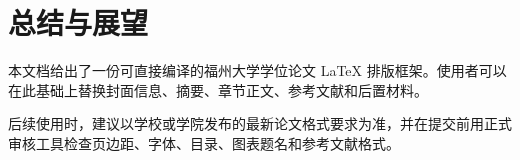 \chapter{总结与展望}

本文档给出了一份可直接编译的福州大学学位论文 \LaTeX{} 排版框架。使用者可以在此基础上替换封面信息、摘要、章节正文、参考文献和后置材料。

后续使用时，建议以学校或学院发布的最新论文格式要求为准，并在提交前用正式审核工具检查页边距、字体、目录、图表题名和参考文献格式。
